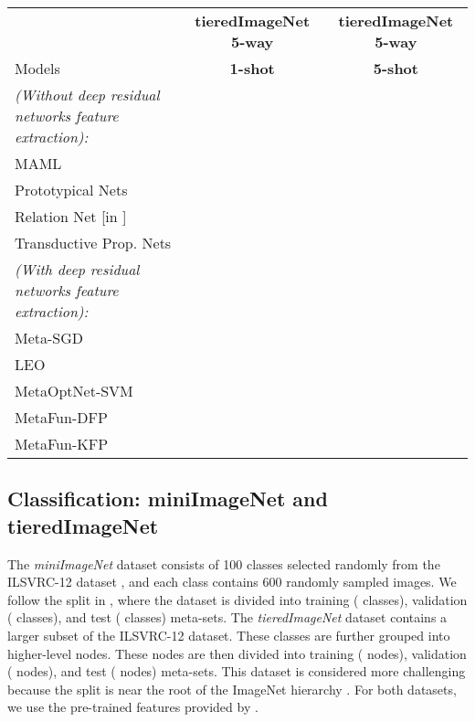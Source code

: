 \documentclass{article}
\theoremstyle{definition}
\begin{document}
\begin{table*}[!htb]
\begin{threeparttable}[]
  \begin{tabular}{l|cc}
    \toprule
     & \textbf{tieredImageNet 5-way}     & \textbf{tieredImageNet 5-way}  \\
    Models    & \textbf{1-shot}     & \textbf{5-shot} \\
    \midrule
    \emph{(Without deep residual networks feature extraction):} & & \\
    MAML \citep{finn2017model} &  &  \\
    Prototypical Nets \citep{snell2017prototypical} &  &  \\
    Relation Net [in \citet{liu2019learning}] &  &  \\
    Transductive Prop. Nets \citep{liu2019learning}\hspace{1cm} &  &  \\
    \midrule
    \emph{(With deep residual networks feature extraction):} & & \\
    Meta-SGD &  &   \\
    LEO &  &   \\
    MetaOptNet-SVM &  &   \\
    MetaFun-DFP &  &   \\
    MetaFun-KFP &  &   \\
    \bottomrule
  \end{tabular}
  \label{tb:classification}
  \end{threeparttable}
\end{table*}


\subsection{Classification: miniImageNet and tieredImageNet}\label{sub:imagenet}

The \emph{miniImageNet} dataset \citep{vinyals2016matching} consists of 100 classes selected randomly from
the ILSVRC-12 dataset \citep{russakovsky2015imagenet}, and each class contains 600 randomly sampled images. We follow the split in \citet{ravi2016optimization}, where the dataset is divided into training ( classes), validation ( classes), and test ( classes) meta-sets. 
The \emph{tieredImageNet} dataset \citep{ren2018meta} contains a larger subset of the ILSVRC-12 dataset. These classes are further grouped into  higher-level nodes. These nodes are then divided into training ( nodes), validation ( nodes), and test ( nodes) meta-sets. This dataset is considered more challenging because the split is near the root of the ImageNet hierarchy \citep{ren2018meta}. For both datasets, we use the pre-trained features provided by \citet{rusu2018meta}. 
\end{document}
